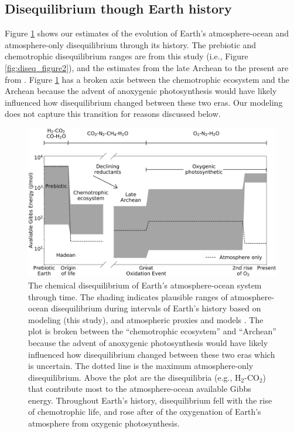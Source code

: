\subsection{Disequilibrium though Earth history}

Figure \ref{fig:diseq_figure3} shows our estimates of the evolution of Earth's atmosphere-ocean and atmosphere-only disequilibrium through its history. The prebiotic and chemotrophic disequilibrium ranges are from this study (i.e., Figure \ref{fig:diseq_figure2}), and the estimates from the late Archean to the present are from \citet{KrissansenTotton_2018_diseq}. Figure \ref{fig:diseq_figure3} has a broken axis between the chemotrophic ecosystem and the Archean because the advent of anoxygenic photosynthesis would have likely influenced how disequilibrium changed between these two eras. Our modeling does not capture this transition for reasons discussed below.

\begin{figure}
  \centering
  \includegraphics[width=1.0\textwidth]{tex/2diseq/Figure3.pdf}
  \caption{The chemical disequilibrium of Earth's atmosphere-ocean system through time. The shading indicates plausible ranges of atmosphere-ocean disequilibrium during intervals of Earth's history based on modeling (this study), and atmospheric proxies and models \citep{KrissansenTotton_2018_diseq}. The plot is broken between the ``chemotrophic ecosystem'' and ``Archean'' because the advent of anoxygenic photosynthesis would have likely influenced how disequilibrium changed between these two eras which is uncertain. The dotted line is the maximum atmosphere-only disequilibrium. Above the plot are the disequilibria (e.g., H$_2$-CO$_2$) that contribute most to the atmosphere-ocean available Gibbs energy. Throughout Earth's history, disequilibrium fell with the rise of chemotrophic life, and rose after of the oxygenation of Earth's atmosphere from oxygenic photosynthesis.}
  \label{fig:diseq_figure3}
\end{figure}

